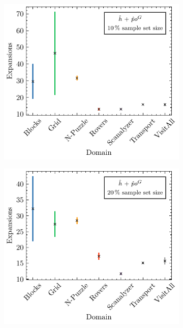 \documentclass[ppgc,diss,english]{iiufrgs}
\begin{document}
\begin{figure}[tb]
  \begin{subfigure}{0.41\textwidth}
    \centering
    \includegraphics[width=\linewidth]{img/error_hNN_poG_10pct.pdf}
  \end{subfigure}
  \begin{subfigure}{0.41\textwidth}
    \centering
    \includegraphics[width=\linewidth]{img/error_hNN_poG_20pct.pdf}
  \end{subfigure}


\end{figure}
\end{document}
